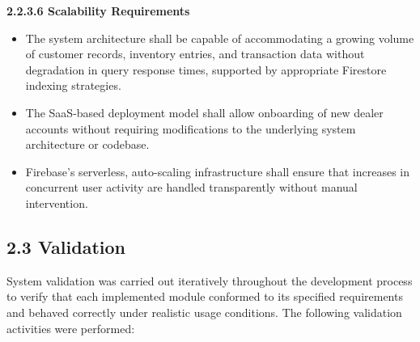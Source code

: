 \documentclass[12pt, oneside]{article}
\begin{document}
\vspace{0.25em}
\textbf{2.2.3.6 Scalability Requirements}
\begin{itemize}
    \item The system architecture shall be capable of accommodating a growing volume of customer records, inventory entries, and transaction data without degradation in query response times, supported by appropriate Firestore indexing strategies.
    \item The SaaS-based deployment model shall allow onboarding of new dealer accounts without requiring modifications to the underlying system architecture or codebase.
    \item Firebase's serverless, auto-scaling infrastructure shall ensure that increases in concurrent user activity are handled transparently without manual intervention.
\end{itemize}

\subsection*{2.3 Validation}

System validation was carried out iteratively throughout the development process to verify that each implemented module conformed to its specified requirements and behaved correctly under realistic usage conditions. The following validation activities were performed:
\end{document}
